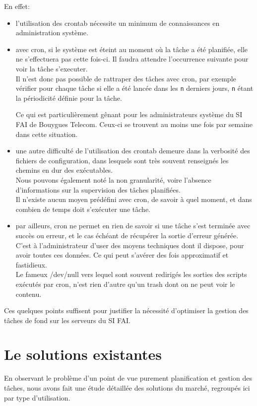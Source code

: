 \documentclass{bouygues-fr}
\begin{document}
En effet:

\begin{itemize}
 \item l'utilisation des crontab nécessite un minimum de connaissances en administration système.
 \item avec cron, si le système est éteint au moment où la tâche a été planifiée, elle ne s'effectuera pas cette fois-ci. Il faudra attendre l'occurrence suivante pour voir la tâche s'executer.\\
Il n'est donc pas possible de rattraper des tâches avec cron, par exemple vérifier pour chaque tâche si elle a été lancée dans les \texttt{n} derniers jours, \texttt{n} étant la périodicité définie pour la tâche.

Ce qui est particulièrement gênant pour les administrateurs système du SI FAI de Bouygues Telecom. Ceux-ci se trouvent au moins une fois par semaine dans cette situation.
\item une autre difficulté de l'utilisation des crontab demeure dans la verbosité des fichiers de configuration, dans lesquels sont très souvent renseignés les chemins en dur des exécutables.\\
Nous pouvons également  noté la non granularité, voire l'absence d'informations sur la supervision des tâches planifiées.\\
Il n'existe aucun moyen prédéfini avec cron, de savoir à quel moment, et dans combien de temps doit s'exécuter une tâche. 
 \item par ailleurs, cron ne permet en rien de savoir si une tâche s'est terminée avec succès ou erreur, et le cas échéant de récupérer la sortie d'erreur générée.\\
C'est à l'administrateur d'user des moyens techniques dont il dispose, pour avoir toutes ces données. Ce qui peut s'avérer des fois approximatif et fastidieux.\\

Le fameux /dev/null vers lequel sont souvent redirigés les sorties des scripts exécutés par cron, n'est rien d'autre qu'un trash dont on ne peut voir le contenu.
 \end{itemize}

Ces quelques points suffisent pour justifier la nécessité d'optimiser la gestion des tâches de fond sur les serveurs du SI FAI.

\vspace{20pt}
\section{Le solutions existantes}
 En observant le problème d'un point de vue purement planification et gestion des tâches, nous avons fait une étude détaillée des solutions du marché, regroupés ici par type d'utilisation.
\end{document}
